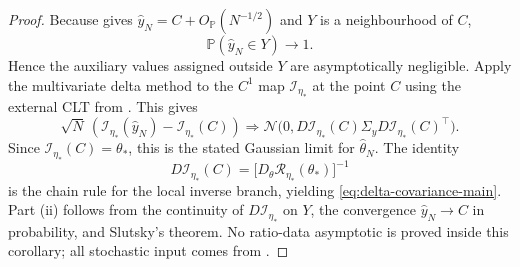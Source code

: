 \begin{proof}
Because  gives
$\widehat y_N=C+O_{\mathbb P}(N^{-1/2})$ and $Y$ is a neighbourhood of $C$,
\[
\mathbb P(\widehat y_N\in Y)\to1.
\]
Hence the auxiliary values assigned outside $Y$ are asymptotically negligible.
Apply the multivariate delta method to the $C^1$ map
$\mathcal I_{\eta_*}$ at the point $C$ using the external CLT from
. This gives
\[
\sqrt{N}\,(\mathcal I_{\eta_*}(\widehat y_N)-\mathcal I_{\eta_*}(C))
\Longrightarrow
\mathcal N\!\bigl(0,
D\mathcal I_{\eta_*}(C)\Sigma_y D\mathcal I_{\eta_*}(C)^\top\bigr).
\]
Since $\mathcal I_{\eta_*}(C)=\theta_*$, this is the stated Gaussian limit for
$\widehat\theta_N$. The identity
\[
D\mathcal I_{\eta_*}(C)=\bigl[D_\theta\mathcal R_{\eta_*}(\theta_*)\bigr]^{-1}
\]
is the chain rule for the local inverse branch, yielding
\eqref{eq:delta-covariance-main}. Part (ii) follows from the continuity of
$D\mathcal I_{\eta_*}$ on $Y$, the convergence
$\widehat y_N\to C$ in probability, and Slutsky's theorem. No ratio-data
asymptotic is proved inside this corollary; all stochastic input comes from
.
\end{proof}

